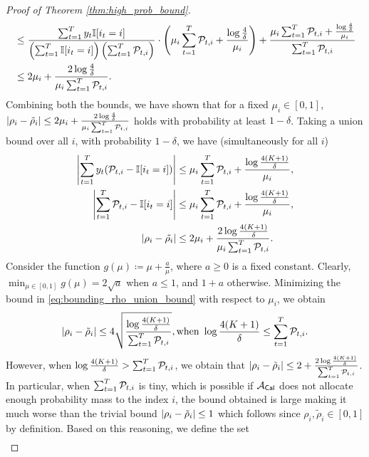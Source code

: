\begin{proof}[Proof of Theorem \ref{thm:high_prob_bound}]
\begin{align*}
    & \le \frac{\sum_{t = 1} ^ {T} y_{t} \mathbb{I}{\left[i_{t} = i\right]}}{\left( \sum_{t = 1} ^ {T} \mathbb{I}{\left[i_{t} = i\right]} \right) \left( \sum_{t = 1} ^ {T} \mathcal{P}_{t, i} \right)} \cdot \left( \mu_{i} \sum_{t = 1} ^ {T} \mathcal{P}_{t, i} + \frac{\log \frac{4}{\delta}}{\mu_{i}} \right) + \frac{\mu_{i} \sum_{t = 1} ^ {T} \mathcal{P}_{t, i} + \frac{\log \frac{4}{\delta}}{\mu_{i}}}{\sum_{t = 1} ^ {T} \mathcal{P}_{t, i}} \\
    &\le 2\mu_{i} + \frac{2\log \frac{4}{\delta}}{\mu_{i}\sum_{t = 1} ^ {T} \mathcal{P}_{t, i}} .
\end{align*}
Combining both the bounds, we have shown that for a fixed $\mu_{i} \in [0, 1]$, $\left\lvert\rho_{i} - \tilde{\rho}_{i}\right\rvert \le 2\mu_{i} + \frac{2\log \frac{4}{\delta}}{\mu_i\sum_{t = 1} ^ {T} \mathcal{P}_{t, i}}$ holds with probability at least $1 - \delta$. Taking a union bound over all $i$, with probability $1 - \delta$, we have (simultaneously for all $i$)
   \begin{align}
    \left\lvert\sum_{t = 1} ^ {T} y_{t}(\mathcal{P}_{t, i} - \mathbb{I}{\left[i_{t} = i\right]})\right\rvert &\le \mu_{i} \sum_{t = 1} ^ {T} \mathcal{P}_{t, i} + \frac{\log \frac{4(K + 1)}{\delta}}{\mu_{i}}, \nonumber\\
    \left\lvert\sum_{t = 1} ^ {T} \mathcal{P}_{t, i} - \mathbb{I}{\left[i_{t} = i\right]}\right\rvert &\le \mu_{i}\sum_{t = 1} ^ {T} \mathcal{P}_{t, i} + \frac{\log \frac{4(K + 1)}{\delta}}{\mu_{i}}, \label{eq:bounding_diff_p_ind} \\
    \left\lvert\rho_{i} - \tilde{\rho_{i}}\right\rvert &\le 2\mu_{i} + \frac{2\log \frac{4 (K + 1)}{\delta}}{\mu_{i} \sum_{t = 1} ^ {T} \mathcal{P}_{t, i}}\label{eq:bounding_rho_union_bound}.
\end{align}
Consider the function $g(\mu) \coloneqq \mu + \frac{a}{\mu}$, where $a \ge 0$ is a fixed constant. Clearly, $\min_{\mu \in [0, 1]} g(\mu) = 2\sqrt{a}$ when $a \le 1$, and $1 + a$ otherwise. Minimizing the bound in \eqref{eq:bounding_rho_union_bound} with respect to $\mu_{i}$, we obtain
\begin{align*}
    \left\lvert\rho_{i} - \tilde{\rho}_{i}\right\rvert \le 4 \sqrt{\frac{\log \frac{4(K + 1)}{\delta}}{\sum_{t = 1} ^ {T} \mathcal{P}_{t, i}}}, \text{when } \log \frac{4(K + 1)}{\delta} \le \sum_{t = 1} ^ {T} \mathcal{P}_{t, i}.
\end{align*}
However, when $\log \frac{4(K + 1)}{\delta} > \sum_{t = 1} ^ {T} \mathcal{P}_{t, i}$, we obtain that $\left\lvert\rho_{i} - \tilde{\rho}_{i}\right\rvert \le 2 + \frac{2\log \frac{4(K + 1)}{\delta}}{\sum_{t = 1} ^ {T} \mathcal{P}_{t, i}}$. In particular, when $\sum_{t = 1} ^ {T} \mathcal{P}_{t, i}$ is tiny, which is possible if $\mathcal{A}_{\mathsf{Cal}}$ does not allocate enough probability mass to the index $i$, the bound obtained is large making it much worse than the trivial bound $\left\lvert\rho_{i} - \tilde{\rho}_i\right\rvert \le 1$ which follows since $\rho_{i}, \tilde{\rho}_{i} \in [0, 1]$ by definition. Based on this reasoning, we define the set \begin{align}\label{eq:defintion_I}

\end{align}
\end{proof}
